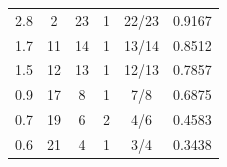 \begin{table}[H]
\begin{tabular}{cccccc}
2.8                                                             & 2                                                      & 23                                                                                & 1                                                                                      & 22/23                                                                                             & 0.9167                         \\
1.7                                                             & 11                                                     & 14                                                                                & 1                                                                                      & 13/14                                                                                             & 0.8512                         \\
1.5                                                             & 12                                                     & 13                                                                                & 1                                                                                      & 12/13                                                                                             & 0.7857                         \\
0.9                                                             & 17                                                     & 8                                                                                 & 1                                                                                      & 7/8                                                                                               & 0.6875                         \\
0.7                                                             & 19                                                     & 6                                                                                 & 2                                                                                      & 4/6                                                                                               & 0.4583                         \\
0.6                                                             & 21                                                     & 4                                                                                 & 1                                                                                      & 3/4                                                                                               & 0.3438                         \\

\end{tabular}
\end{table}
